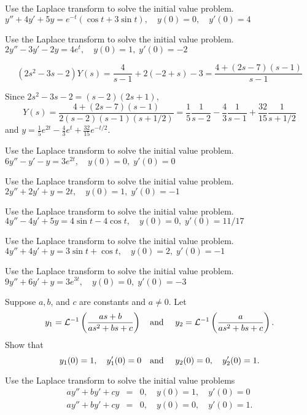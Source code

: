 \documentclass{ximera}
\begin{document}
\begin{problem}\label{exer:8.3.31} Use the Laplace transform to solve the initial value problem. $y''+4y'+5y=e^{-t}(\cos t+3\sin t), \quad
y(0)=0,\quad y'(0)=4$
\end{problem}

\begin{problem}\label{exer:8.3.32} Use the Laplace transform to solve the initial value problem. $2y''-3y'-2y=4e^t, \quad   y(0)=1,\;  y'(0)=-2$

\begin{solution}
$$
(2s^2-3s-2)Y(s)=\frac{4}{s-1}+2(-2+s)-3=\frac{4+(2s-7)(s-1)}{s-1}
$$

Since $2s^2-3s-2=(s-2)(2s+1)$,
$$
Y(s)=\frac{4+(2s-7)(s-1)}{2(s-2)(s-1)(s+1/2)}=
\frac{1}{5}\frac{1}{s-2}-\frac{4}{3}\frac{1}{s-1}+\frac{32}{15}\frac{1}{s+1/2}
$$
and
 $y=\frac{1}{5}e^{2t}-\frac{4}{3}e^t
+\frac{32}{15}e^{-t/2}$.
\end{solution}
\end{problem}

\begin{problem}\label{exer:8.3.33} Use the Laplace transform to solve the initial value problem. $6y''-y'-y=3e^{2t}, \quad   y(0)=0,\;  y'(0)=0$
\end{problem}

\begin{problem}\label{exer:8.3.34} Use the Laplace transform to solve the initial value problem. $2y''+2y'+y=2t, \quad   y(0)=1,\;  y'(0)=-1$
\end{problem}

\begin{problem}\label{exer:8.3.35} Use the Laplace transform to solve the initial value problem. $4y''-4y'+5y=4\sin t-4\cos t, \quad   y(0)=0,\;  y'(0)=11/17$
\end{problem}

\begin{problem}\label{exer:8.3.36} Use the Laplace transform to solve the initial value problem. $4y''+4y'+y=3\sin t+\cos t, \quad   y(0)=2,\;  y'(0)=-1$
\end{problem}

\begin{problem}\label{exer:8.3.37} Use the Laplace transform to solve the initial value problem. $9y''+6y'+y=3e^{3t}, \quad   y(0)=0,\;  y'(0)=-3$
\end{problem}

\begin{problem}\label{exer:8.3.38}
Suppose $a,b$, and $c$ are constants and $a\ne0$.  Let
$$
y_1={\cal L}^{-1}\left(as+b\over as^2+bs+c\right)\mbox{\quad and \quad}
y_2={\cal L}^{-1}\left(a\over as^2+bs+c\right).
$$
Show that
$$
y_1(0)=1,\quad y_1'(0)=0\mbox{\quad and \quad} y_2(0)=0,\quad y_2'(0)=1.
$$
\begin{hint}
Use the Laplace transform to solve the initial value
problems
\begin{eqnarray*}
ay''+by'+cy&=&0, \quad   y(0)=1,\quad y'(0)=0 \\
ay''+by'+cy&=&0, \quad  y(0)=0,\quad y'(0)=1.
\end{eqnarray*}
\end{hint}
\end{problem}
\end{document}
